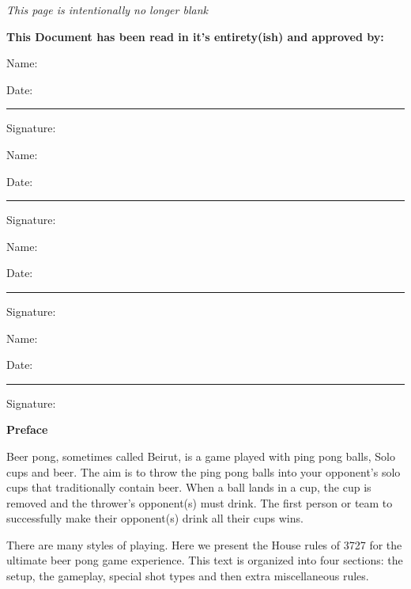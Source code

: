 \documentclass[11pt, oneside,letterpaper]{article}
\begin{document}
	

	\newpage\thispagestyle{empty}
	\emph{This page is intentionally no longer blank}

\newpage\thispagestyle{empty}
\textbf{This Document has been read in it's entirety(ish) and approved by: }

\vspace{1.5cm}
\noindent Name: \hrulefill

\vspace{1cm}
\noindent Date: \rule{1.5in}{0.5pt} Signature: \hrulefill 

\vspace{1.5cm}
\noindent Name: \hrulefill

\vspace{1cm}
\noindent Date: \rule{1.5in}{0.5pt} Signature: \hrulefill

\vspace{1.5cm}
\noindent Name: \hrulefill 

\vspace{1cm}
\noindent Date: \rule{1.5in}{0.5pt} Signature: \hrulefill

\vspace{1.5cm}
\noindent Name: \hrulefill

\vspace{1cm}
\noindent Date: \rule{1.5in}{0.5pt} Signature: \hrulefill 

	\newpage\thispagestyle{empty}
	\tableofcontents \thispagestyle{empty}
	\newpage

	\setcounter{page}{1} %
	\begin{center}
		\textbf{Preface}
	\end{center}
		Beer pong, sometimes called Beirut, is a game played with ping pong balls, Solo cups and beer.
        The aim is to throw the ping pong balls into your opponent's solo cups that traditionally contain beer.
        When a ball lands in a cup, the cup is removed and the thrower's opponent(s) must drink.
        The first person or team to successfully make their opponent(s) drink all their cups wins.

		There are many styles of playing.
        Here we present the House rules of 3727 for the ultimate beer pong game experience. 
        This text is organized into four sections: the setup, the gameplay, special shot types and then extra miscellaneous rules.


		




\end{document}
